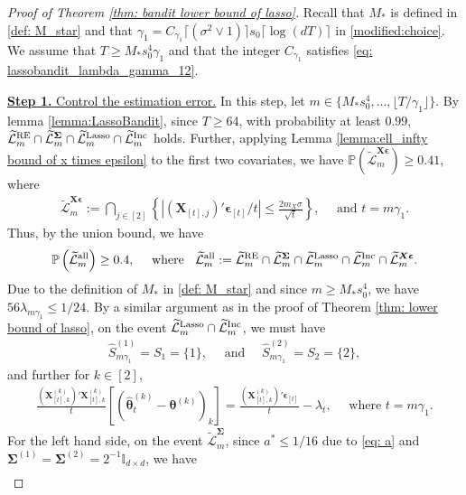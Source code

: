 \documentclass[aos,preprint]{imsart}
\theoremstyle{plain}
\theoremstyle{definition}
\newcommand{\btheta}{\boldsymbol{\theta}}
\newcommand{\bd}[1]{\boldsymbol{#1}}
\newcommand{\hbtheta}{\widehat{\boldsymbol{\theta}}}
\newcommand{\bX}{\boldsymbol{X}}
\newcommand{\bSigma}{\boldsymbol{\Sigma}}
\newcommand{\bepsilon}{\bd{\epsilon}}
\newcommand{\Pro}{\mathbb{P}}
\newcommand{\tL}{\widetilde{\mathcal{L}}}
\begin{document}
\begin{appendix}
\begin{proof}[Proof of Theorem \ref{thm: bandit lower bound of lasso}]
Recall that $M_*$ is defined in \eqref{def: M_star} and that $\gamma_1 = C_{\gamma_1}  \lceil(\sigma^2\vee 1)\rceil s_0 \lceil \log (dT) \rceil$ in \eqref{modified:choice}. We assume that $T \geq M_* s_0^4\gamma_1$ and that the integer $C_{\gamma_1}$ satisfies \eqref{eq: lassobandit_lambda_gamma_12}.

\medskip
\noindent \underline{\textbf{Step 1.} Control the estimation error.} In this step,
let $m \in \{M_* s_0^4,\ldots, \lfloor T/\gamma_1\rfloor\}$. 
By lemma \ref{lemma:LassoBandit},   since $T \geq 64$,   with probability at least $0.99$, $\tL_m^{\textup{RE}} \cap \tL_m^{\bSigma} \cap  \tL_m^{\textup{Lasso}} \cap \tL_m^{\textup{Inc}}$ holds. 
Further, applying Lemma \ref{lemma:ell_infty bound of x times epsilon} to the first two covariates, we have $\Pro\left( \tL_m^{\bX\bepsilon}
 \right) \geq 0.41$, where 
\begin{align*}
\tL_m^{\bX\bepsilon} := \bigcap_{j \in [2]}
 \left\{ 
 \left|(\bX_{[t],j})' \bepsilon_{[t]}/t \right|
 \leq \frac{2m_X\sigma}{\sqrt{t}}  \right\}, \quad \text{ and } t = m\gamma_1.
\end{align*}
Thus, by the union bound, we have
\begin{align}\label{aux:lasso_bandit_overall}
    \Pro\left(\tL_m^{\textup{all}} \right) \geq 0.4, \quad \text{ where }\;\;
    \tL_m^{\textup{all}} := \tL_m^{\textup{RE}} \cap \tL_m^{\bSigma} \cap  \tL_m^{\textup{Lasso}} \cap \tL_m^{\textup{Inc}} \cap \tL_m^{\bX\bepsilon}.
\end{align}
Due to the definition of $M_*$ in \eqref{def: M_star} and since $m \geq M_* s_0^4$, we have $56\lambda_{m\gamma_1} \leq 1/24$.
By a similar argument as in the proof of Theorem \ref{thm: lower bound of lasso}, on the event $\tL_m^{\textup{Lasso}} \cap \tL_m^{\textup{Inc}}$, we must have
\begin{align}\label{aux:support_recov_lassobandit}
    \hat{S}_{m\gamma_1}^{(1)} = S_1 = \{1\}, \quad    \text{ and }  \quad \hat{S}_{m\gamma_1}^{(2)} = S_2 = \{2\},
\end{align}
and further for $k \in [2]$,
\begin{align*}
\frac{(\bX_{[t],k}^{(k)})'\bX_{[t],k}^{(k)}}{t}[(\hbtheta_t^{(k)}-\btheta^{(k)})_k]=\frac{(\bX_{[t],k}^{(k)})'\bepsilon_{[t]}}{t} - \lambda_t, \quad \text{ where } t = m\gamma_1.
\end{align*}
For the left hand side, on the event $\tL_m^{\bSigma}$, since $a^* \leq 1/16$ due to \eqref{eq: a} and $\bSigma^{(1)} = \bSigma^{(2)} = 2^{-1} \mathbb{I}_{d \times d}$, we have
\begin{align*}

\end{align*}
\end{proof}
\end{appendix}
\end{document}
